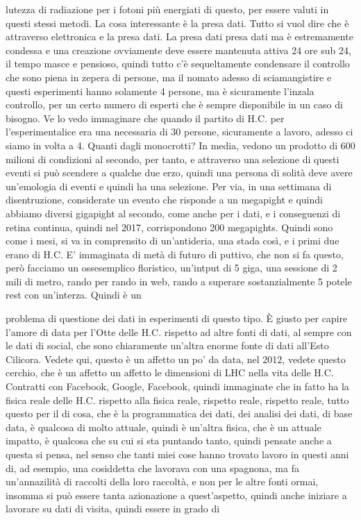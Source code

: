 {lutezza di radiazione per i fotoni più energiati di questo, per essere valuti in questi stessi metodi. La cosa interessante è la presa dati. Tutto si vuol dire che è attraverso elettronica e la presa dati. La presa dati presa dati ma è estremamente condessa e una creazione ovviamente deve essere mantenuta attiva 24 ore sub 24, il tempo masce e pensioso, quindi tutto c'è sequeltamente condensare il controllo che sono piena in zepera di persone, ma il nomato adesso di sciamangistire e questi esperimenti hanno solamente 4 persone, ma è sicuramente l'inzala controllo, per un certo numero di esperti che è sempre disponibile in un caso di bisogno. Ve lo vedo immaginare che quando il partito di H.C. per l'esperimentalice era una necessaria di 30 persone, sicuramente a lavoro, adesso ci siamo in volta a 4. Quanti dagli monocrotti? In media, vedono un prodotto di 600 milioni di condizioni al secondo, per tanto, e attraverso una selezione di questi eventi si può scendere a qualche due erzo, quindi una persona di solità deve avere un'emologia di eventi e quindi ha una selezione. Per via, in una settimana di disentruzione, considerate un evento che risponde a un megapight e quindi abbiamo diversi gigapight al secondo, come anche per i dati, e i conseguenzi di retina continua, quindi nel 2017, corrispondono 200 megapights. Quindi sono come i mesi, si va in comprensito di un'antideria, una stada così, e i primi due erano di H.C. E' immaginata di metà di futuro di puttivo, che non si fa questo, però facciamo un ossesemplico floristico, un'intput di 5 giga, una sessione di 2 mili di metro, rando per rando in web, rando a superare sostanzialmente 5 potele rest con un'interza. Quindi è un 

problema di questione dei dati in esperimenti di questo tipo. È giusto per capire l'amore di data per l'Otte delle H.C. rispetto ad altre fonti di dati, al sempre con le dati di social, che sono chiaramente un'altra enorme fonte di dati all'Esto Cilicora. Vedete qui, questo è un affetto un po' da data, nel 2012, vedete questo cerchio, che è un affetto un affetto le dimensioni di LHC nella vita delle H.C. Contratti con Facebook, Google, Facebook, quindi immaginate che in fatto ha la fisica reale delle H.C. rispetto alla fisica reale, rispetto reale, rispetto reale, tutto questo per il di cosa, che è la programmatica dei dati, dei analisi dei dati, di base data, è qualcosa di molto attuale, quindi è un'altra fisica, che è un attuale impatto, è qualcosa che su cui si sta puntando tanto, quindi pensate anche a questa si pensa, nel senso che tanti miei cose hanno trovato lavoro in questi anni di, ad esempio, una cosiddetta che lavorava con una spagnona, ma fa un'annazilità di raccolti della loro raccoltà, e non per le altre fonti ormai, insomma si può essere tanta azionazione a quest'aspetto, quindi anche iniziare a lavorare su dati di visita, quindi essere in grado di 

}
